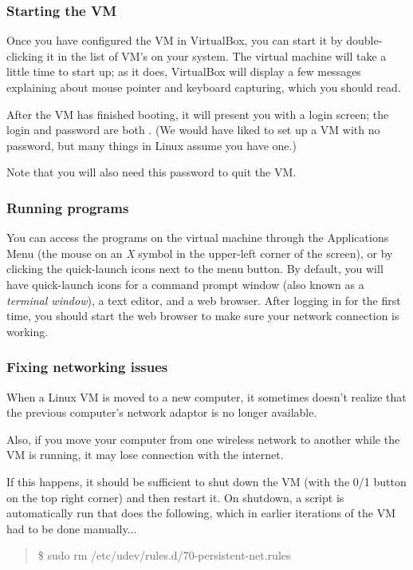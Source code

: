 \documentclass[letterpaper,10pt,english]{sphinxmanual}
\begin{document}
\subsubsection{Starting the VM}
\label{2013/vm:starting-the-vm}
Once you have configured the VM in VirtualBox, you can start it by
double-clicking it in the list of VM's on your system.  The virtual
machine will take a little time to start up; as it does, VirtualBox
will display a few messages explaining about mouse pointer and
keyboard capturing, which you should read.

After the VM has finished booting, it will present you with a login
screen; the login and password are both .  (We would have
liked to set up a VM with no password, but many things in Linux assume
you have one.)

Note that you will also need this password to quit the VM.


\subsubsection{Running programs}
\label{2013/vm:running-programs}
You can access the programs on the virtual machine through the Applications
Menu (the mouse on an \emph{X} symbol in the upper-left corner of the
screen), or by clicking the quick-launch icons next to the menu
button.  By default, you will have quick-launch icons for a command
prompt window (also known as a \emph{terminal window}), a text editor, and
a web browser.  After logging in for the first time, you should start
the web browser to make sure your network connection is working.


\subsubsection{Fixing networking issues}
\label{2013/vm:fixing-networking-issues}
When a Linux VM is moved to a new computer, it sometimes doesn't
realize that the previous computer's network adaptor is no longer
available.

Also, if you move your computer from one wireless network to another while
the VM is running, it may lose connection with the internet.

If this happens, it should be sufficient to shut down the VM (with the 0/1
button on the top right corner) and then restart it.
On shutdown, a script is automatically run that does the following, which in
earlier iterations of the VM had to be done manually...
\begin{quote}

\$ sudo rm /etc/udev/rules.d/70-persistent-net.rules
\end{quote}
\end{document}
